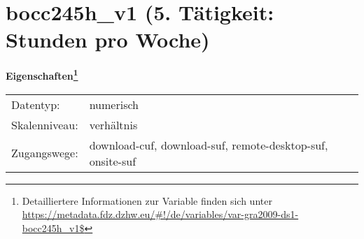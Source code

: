 
    \setcounter{footnote}{0}

    \vspace*{-1.8cm}
	\section{bocc245h\_v1 (5. Tätigkeit: Stunden pro Woche)}
	\label{section:bocc245h_v1}



    \vspace*{0.5cm}
    \noindent\textbf{Eigenschaften\footnote{Detailliertere Informationen zur Variable finden sich unter
		\url{https://metadata.fdz.dzhw.eu/\#!/de/variables/var-gra2009-ds1-bocc245h_v1$}}}\\
	\begin{tabularx}{\hsize}{@{}lX}
	Datentyp: & numerisch \\
	Skalenniveau: & verhältnis \\
	Zugangswege: &
	  download-cuf, 
	  download-suf, 
	  remote-desktop-suf, 
	  onsite-suf
 \\
    \end{tabularx}



